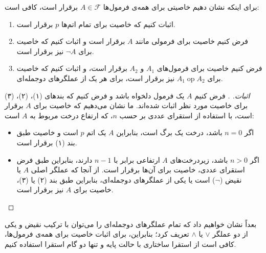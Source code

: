   \begin{theorem}
   برای اینکه نشان دهیم خاصیتی برای همه‌ی فرمول‌ها $A \in \mathscr{F}$ برقرار است، کافی است:
   
   \begin{enumerate}
     \item اثبات کنیم که خاصیت برای تمام اتم‌ها $p$ برقرار است.
     \item فرض کنیم خاصیت برای فرمولی مانند $A$ برقرار است و اثبات کنیم که خاصیت برای $\neg A$ نیز برقرار است.
     \item فرض کنیم خاصیت برای فرمول‌های $A_1$ و $A_2$ برقرار است، و اثبات کنیم که خاصیت برای $A_1 \mathbin{\operatorname{op}} A_2$ نیز برقرار است، برای هر یک از عملگرهای دوجمله‌ای.
   \end{enumerate}
  \end{theorem}

  \begin{proof}[اثبات. ]
    فرض کنیم $A$ یک فرمول دلخواه باشد و فرض کنیم که بندهای (۱)، (۲)، (۳) برای خاصیت مورد نظر اثبات شده‌اند. ما نشان می‌دهیم که خاصیت برای $A$ برقرار است، با استفاده از استقرای عددی بر حسب $n$، که ارتفاع درخت مربوط به $A$ است:
    \begin{itemize}
      \item اگر $n = 0$ باشد، درخت یک برگ است، بنابراین $A$ یک اتم $p$ است و خاصیت طبق بند (۱) برقرار است.
      \item اگر $n > 0$ باشد، زیر‌درخت‌های $A$ ارتفاعی برابر با $n - 1$ دارند، بنابراین طبق فرض استقرای عددی، خاصیت برای آن‌ها برقرار است. از آنجا که عملگر اصلی $A$ یا نقیض ($\neg$) است یا یکی از عملگرهای دوجمله‌ای، بنابراین طبق بند (۲) یا (۳)، خاصیت برای $A$ نیز برقرار است.
    \end{itemize}
  \end{proof}
  بعداً نشان خواهیم داد که تمام عملگرهای دوجمله‌ای را می‌توان با ترکیب نقیض و یکی از دو عملگر $\lor$ یا $\land$ تعریف کرد؛ بنابراین، برای اثبات خاصیت برای همه‌ی فرمول‌ها، کافی است از استقرا ساختاری با حالت پایه و تنها دو گام استقرا استفاده کنیم.